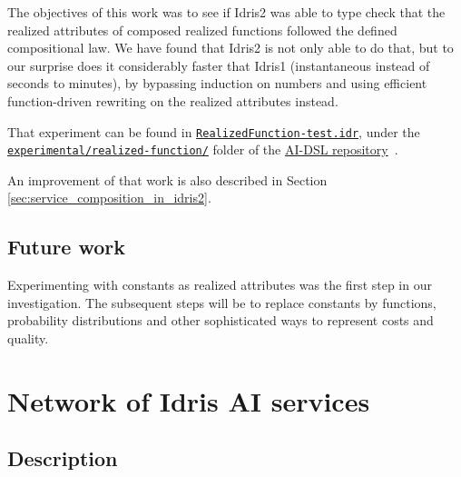 \documentclass[]{report}
\begin{document}
The objectives of this work was to see if Idris2 was able to type
check that the realized attributes of composed realized functions
followed the defined compositional law.  We have found that Idris2 is
not only able to do that, but to our surprise does it considerably
faster that Idris1 (instantaneous instead of seconds to minutes), by
bypassing induction on numbers and using efficient function-driven
rewriting on the realized attributes instead.

That experiment can be found in
\href{https://github.com/singnet/ai-dsl/blob/master/experimental/realized-function/RealizedFunction-test.idr}{\texttt{RealizedFunction-test.idr}},
under the
\href{https://github.com/singnet/ai-dsl/blob/master/experimental/realized-function/}{\texttt{experimental/realized-function/}}
folder of the \href{https://github.com/singnet/ai-dsl/}{AI-DSL
  repository}~\cite{AIDSLRepo}.

An improvement of that work is also described in Section
\ref{sec:service_composition_in_idris2}.

\subsection{Future work}

Experimenting with constants as realized attributes was the first step
in our investigation.  The subsequent steps will be to replace
constants by functions, probability distributions and other
sophisticated ways to represent costs and quality.

\section{Network of Idris AI services}
\label{sec:network_idris_ai_services}

\subsection{Description}
\end{document}
